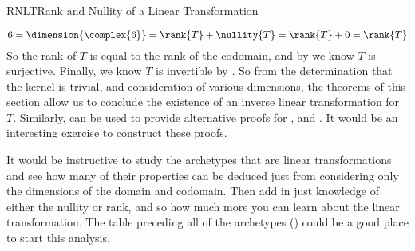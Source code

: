 \begin{subsect}{RNLT}{Rank and Nullity of a Linear Transformation}
\begin{para}
%
\begin{equation*}
6=\dimension{\complex{6}}=\rank{T}+\nullity{T}=\rank{T}+0=\rank{T}
\end{equation*}
%
So the rank of $T$ is equal to the rank of the codomain, and by  we know $T$ is surjective.  Finally, we know $T$ is invertible by .  So from the determination that the kernel is trivial, and consideration of various dimensions, the theorems of this section allow us to conclude the existence of an inverse linear transformation for $T$.
%
Similarly,  can be used to provide alternative proofs for ,  and .  It would be an interesting exercise to construct these proofs.\end{para}
%
\begin{para}It would be instructive to study the archetypes that are linear transformations and see how many of their properties can be deduced just from considering only the dimensions of the domain and codomain.  Then add in just knowledge of either the nullity or rank, and so how much more you can learn about the linear transformation.  The table preceding all of the archetypes () could be a good place to start this analysis.\end{para}
%
%
\end{subsect}
%
